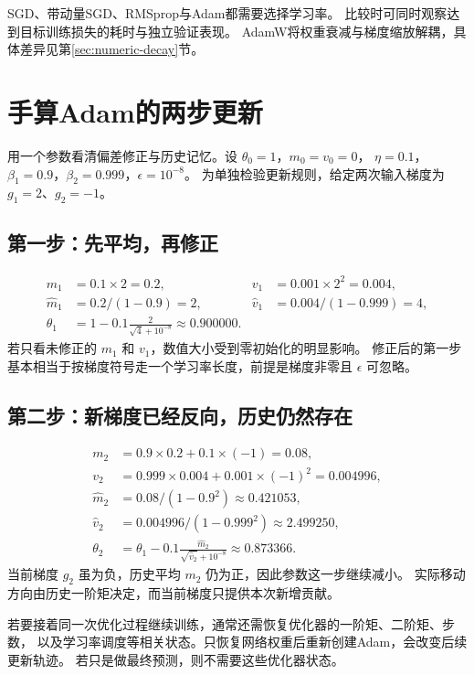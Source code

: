 SGD、带动量SGD、RMSprop与Adam都需要选择学习率。
比较时可同时观察达到目标训练损失的耗时与独立验证表现。
AdamW将权重衰减与梯度缩放解耦，具体差异见第\ref{sec:numeric-decay}节。

\section{手算Adam的两步更新}
\label{sec:train-adam-example}

用一个参数看清偏差修正与历史记忆。设 $\theta_0=1$，$m_0=v_0=0$，
$\eta=0.1$，$\beta_1=0.9$，$\beta_2=0.999$，$\epsilon=10^{-8}$。
为单独检验更新规则，给定两次输入梯度为 $g_1=2$、$g_2=-1$。

\subsection{第一步：先平均，再修正}
\begin{align*}
 m_1&=0.1\times2=0.2, &v_1&=0.001\times2^2=0.004,\\
 \hat m_1&=0.2/(1-0.9)=2, &\hat v_1&=0.004/(1-0.999)=4,\\
 \theta_1&=1-0.1\frac2{\sqrt4+10^{-8}}\approx0.900000.
\end{align*}
若只看未修正的 $m_1$ 和 $v_1$，数值大小受到零初始化的明显影响。
修正后的第一步基本相当于按梯度符号走一个学习率长度，前提是梯度非零且 $\epsilon$ 可忽略。

\subsection{第二步：新梯度已经反向，历史仍然存在}
\begin{align*}
 m_2&=0.9\times0.2+0.1\times(-1)=0.08,\\
 v_2&=0.999\times0.004+0.001\times(-1)^2=0.004996,\\
 \hat m_2&=0.08/(1-0.9^2)\approx0.421053,\\
 \hat v_2&=0.004996/(1-0.999^2)\approx2.499250,\\
 \theta_2&=\theta_1-0.1\frac{\hat m_2}{\sqrt{\hat v_2}+10^{-8}}
             \approx0.873366.
\end{align*}
当前梯度 $g_2$ 虽为负，历史平均 $m_2$ 仍为正，因此参数这一步继续减小。
实际移动方向由历史一阶矩决定，而当前梯度只提供本次新增贡献。

\begin{pitfall}[恢复完整训练状态]
若要接着同一次优化过程继续训练，通常还需恢复优化器的一阶矩、二阶矩、步数，
以及学习率调度等相关状态。只恢复网络权重后重新创建Adam，会改变后续更新轨迹。
若只是做最终预测，则不需要这些优化器状态。
\end{pitfall}

